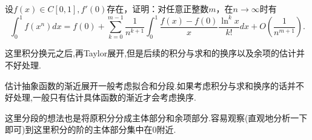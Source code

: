 \documentclass[lang=cn,newtx,10pt,scheme=chinese]{elegantbook}
\begin{document}
\begin{example}
设\(f(x)\in C[0,1],f'(0)\)存在，证明：对任意正整数\(m\)，在\(n\rightarrow\infty\)时有
\[
\int_{0}^{1}f(x^{n})dx = f(0)+\sum_{k = 0}^{m - 1}\frac{1}{n^{k + 1}}\int_{0}^{1}\frac{f(x)-f(0)}{x}\frac{\ln^{k}x}{k!}dx + O\left(\frac{1}{n^{m+1}}\right).
\]
\end{example}
\begin{remark}
这里积分换元之后,再Taylor展开,但是后续的积分与求和的换序以及余项的估计并不好处理.
\end{remark}
\begin{note}
估计抽象函数的渐近展开一般考虑拟合和分段.如果考虑积分与求和换序的话并不好处理,一般只有估计具体函数的渐近才会考虑换序.

这里分段的想法也是将原积分分成主体部分和余项部分.容易观察(直观地分析一下即可)到这里积分的阶的主体部分集中在0附近.
\end{note}
\end{document}
